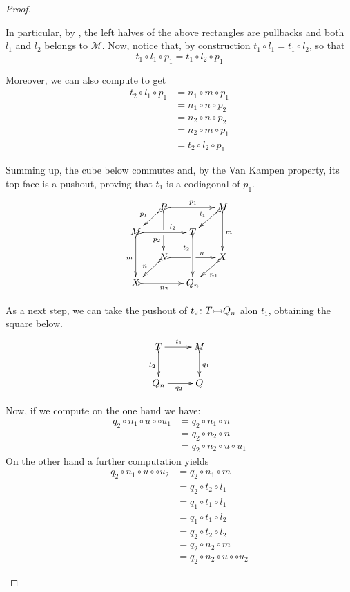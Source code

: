 \documentclass[a4paper]{article}
\newcommand{\mto}[0]{\scalebox{1}{$\rightarrowtail$}}
\def\X{\textbf {\textup{X}}}
\theoremstyle{definition}
\begin{document}
\begin{proof}
\begin{enumerate}
		In particular, by , the left halves of the above rectangles are pullbacks and both $l_1$ and $l_2$ belongs to $\mathcal{M}$. Now, notice that, by construction $t_1\circ l_1=t_1\circ l_2$, so that
		\[	t_1\circ l_1\circ p_1=	t_1\circ l_2\circ p_1\]
		
		Moreover, we can also compute to get
		\begin{align*}
		t_2\circ l_1\circ p_1&=n_1\circ m \circ p_1\\&=n_1\circ n\circ p_2\\&=n_2\circ n\circ p_2\\&=n_2\circ m\circ p_1\\&= t_2\circ l_2\circ p_1
		\end{align*} 
		
		Summing up, the cube below commutes and,  by the Van Kampen property, its top face is a pushout, proving that $t_1$ is a codiagonal of $p_1$.
		\[\xymatrix@C=13pt@R=13pt{&P\ar@{>->}[dd]|\hole_(.65){p_2}\ar@{>->}[rr]^{p_1} \ar@{>->}[dl]_{p_1} && M \ar@{>->}[dd]^{m} \ar@{>->}[dl]_{l_1}\\ M  \ar@{>->}[dd]_{m}\ar@{>->}[rr]^(.65){l_2} & & T\ar@{>->}[dd]_(.3){t_2}\\&N\ar@{>->}[rr]|\hole^(.65){n} \ar@{>->}[dl]_{n} && X \ar@{>->}[dl]^{n_1} \\X \ar@{>->}[rr]_{n_2} & & Q_n}\]
		
		As a next step, we can take the pushout of $t_2\colon T\mto Q_n$ alon $t_1$, obtaining the square below.
		\[\xymatrix{T \ar[r]^{t_1} \ar@{>->}[d]_{t_2}& M \ar@{>->}[d]^{q_1}\\ Q_n \ar[r]_{q_2} & Q }\]
		
		Now, if we compute on the one hand we have:
		\begin{align*}
			q_2\circ n_1\circ u \circ \circ u_1&=q_2\circ n_1\circ n\\&=q_2\circ n_2\circ n\\&=q_2\circ n_2 \circ u\circ u_1
		\end{align*}
		On the other hand a further computation yields
		\begin{align*}
		q_2\circ n_1\circ u \circ \circ u_2&=q_2\circ n_1\circ m\\&=q_2\circ t_2\circ l_1\\&=q_1\circ t_1 \circ l_1\\&=q_1\circ t_1\circ l_2\\&=q_2\circ t_2\circ l_2\\&=q_2\circ n_2\circ m\\&=q_2\circ n_2\circ u \circ \circ u_2
		\end{align*}
		

\end{enumerate}
\end{proof}
\end{document}
